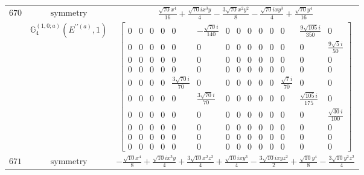 \documentclass[fleqn,8pt,landscape]{jsarticle}
\begin{document}
\begin{longtable}{ccc}
$ 670 $ & $ \text{symmetry} $ & $ \frac{\sqrt{70} x^{4}}{16} + \frac{\sqrt{70} i x^{3} y}{4} - \frac{3 \sqrt{70} x^{2} y^{2}}{8} - \frac{\sqrt{70} i x y^{3}}{4} + \frac{\sqrt{70} y^{4}}{16} $ \\
$  $ & $ \mathbb{G}_{4}^{(1,0;a)}(E^{\prime\prime(a)},1) $ & $ \begin{bmatrix} 0 & 0 & 0 & 0 & 0 & - \frac{\sqrt{70} i}{140} & 0 & 0 & 0 & 0 & 0 & 0 & \frac{9 \sqrt{105} i}{350} & 0 \\ 0 & 0 & 0 & 0 & 0 & 0 & 0 & 0 & 0 & 0 & 0 & 0 & 0 & \frac{9 \sqrt{5} i}{50} \\ 0 & 0 & 0 & 0 & 0 & 0 & 0 & 0 & 0 & 0 & 0 & 0 & 0 & 0 \\ 0 & 0 & 0 & 0 & 0 & 0 & 0 & 0 & 0 & 0 & 0 & 0 & 0 & 0 \\ 0 & 0 & 0 & 0 & \frac{3 \sqrt{70} i}{70} & 0 & 0 & 0 & 0 & 0 & 0 & \frac{\sqrt{7} i}{70} & 0 & 0 \\ 0 & 0 & 0 & 0 & 0 & \frac{3 \sqrt{70} i}{70} & 0 & 0 & 0 & 0 & 0 & 0 & \frac{\sqrt{105} i}{175} & 0 \\ 0 & 0 & 0 & 0 & 0 & 0 & 0 & 0 & 0 & 0 & 0 & 0 & 0 & \frac{\sqrt{30} i}{100} \\ 0 & 0 & 0 & 0 & 0 & 0 & 0 & 0 & 0 & 0 & 0 & 0 & 0 & 0 \\ 0 & 0 & 0 & 0 & 0 & 0 & 0 & 0 & 0 & 0 & 0 & 0 & 0 & 0 \\ 0 & 0 & 0 & 0 & 0 & 0 & 0 & 0 & 0 & 0 & 0 & 0 & 0 & 0 \end{bmatrix} $ \\ \hline
$ 671 $ & $ \text{symmetry} $ & $ - \frac{\sqrt{10} x^{4}}{8} + \frac{\sqrt{10} i x^{3} y}{4} + \frac{3 \sqrt{10} x^{2} z^{2}}{4} + \frac{\sqrt{10} i x y^{3}}{4} - \frac{3 \sqrt{10} i x y z^{2}}{2} + \frac{\sqrt{10} y^{4}}{8} - \frac{3 \sqrt{10} y^{2} z^{2}}{4} $ \\

\end{longtable}
\end{document}
